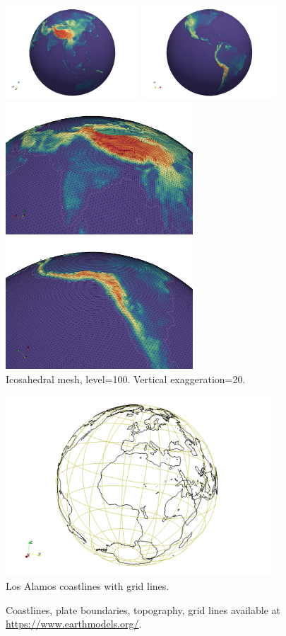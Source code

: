 \begin{center}
\includegraphics[width=5cm]{python_codes/fieldstone_69/topo/topo3D_2.png}
\includegraphics[width=5cm]{python_codes/fieldstone_69/topo/topo3D_3.png}\\
\includegraphics[width=7cm]{python_codes/fieldstone_69/topo/topo3D_4.png}
\includegraphics[width=7cm]{python_codes/fieldstone_69/topo/topo3D_5.png}\\
{\captionfont Icosahedral mesh, level=100. Vertical exaggeration=20.}
\end{center}


\begin{center}
\includegraphics[width=10cm]{python_codes/fieldstone_69/images/coastlines_gridlines}\\
{\captionfont Los Alamos coastlines with grid lines.}
\end{center}

Coastlines, plate boundaries, topography, grid lines available at \url{https://www.earthmodels.org/}.
